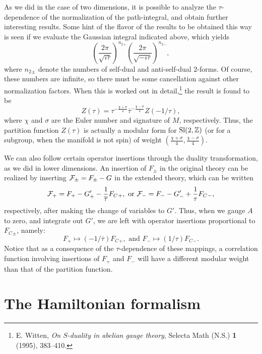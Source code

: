 As we did in the case of two dimensions, it is possible to analyze the
$\tau$-dependence of the normalization of the path-integral, and obtain
further interesting results.  Some hint of the flavor of the results to be
obtained this way is seen if we evaluate the Gaussian integral indicated
above, which yields
\begin{equation}
\left(\frac{2\pi}{\sqrt{i\overline{\tau}}}\right)^{n_2{}_+}
\left(\frac{2\pi}{\sqrt{-i{\tau}}}\right)^{n_2{}_-}  ,
\end{equation}
where $n_2{}_\pm$ denote the numbers of self-dual and anti-self-dual
$2$-forms.  Of course, these numbers are infinite, so there must be some
cancellation against other normalization factors.  When this is worked out
in detail,\footnote{E. Witten, {\it On $S$-duality in abelian gauge
theory}, Selecta Math (N.S.) {\bf 1} (1995), 383--410.}
the result is found to be
\begin{equation}
Z(\tau)=\tau^{-\frac{\chi+\sigma}4}\overline{\tau}^{-\frac{\chi-\sigma}4}
Z(-1/\tau),
\end{equation}
where $\chi$ and $\sigma$ are the Euler number and signature of $M$,
respectively.   Thus, the partition function $Z(\tau)$ is actually a
modular form for $\operatorname{Sl}(2,{\Bbb Z})$ (or for a subgroup, when the manifold is not
spin) of weight
$(\frac{\chi+\sigma}4,\frac{\chi-\sigma}4)$.

We can also follow certain operator insertions through the duality
transformation, as we did in lower dimensions.  An insertion of $F_\pm$ in
the original theory can be realized by inserting ${\cal F}_\pm=F_\pm-G$ in the
extended theory, which can be written
\begin{equation}
{\cal F}_+=F_+-G'_+-\frac1{\overline{\tau}}F_C{}_+, \text{\ or\ }
{\cal F}_-=F_--G'_-+\frac1{\tau}F_C{}_-,
\end{equation}
respectively,
after making the change of variables to $G'$.  Thus, when we gauge $A$ to
zero, and integrate out $G'$, we are left with operator insertions
proportional to $F_C{}_\pm$, namely:
\begin{equation}\label{opmap}
F_+\mapsto(-1/{\overline{\tau}})F_C{}_+, \text{\ and\ }
F_-\mapsto(1/{\tau})F_C{}_- .
\end{equation}
Notice that as a consequence of the $\tau$-dependence of these mappings,
a correlation function involving insertions of $F_+$ and $F_-$ will
have a different modular weight than that of the partition function.



\section{The Hamiltonian formalism}

